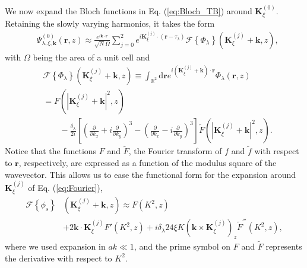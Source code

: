 \documentclass[showpacs,aps,prb,reprint,twocolumn]{revtex4-1}
\begin{document}
We now expand the Bloch functions in Eq. (\ref{eq:Bloch_TB}) around $\boldsymbol{K}_\xi^{(0)}$. Retaining the slowly varying harmonics, it takes the form
\begin{align}\label{eq:Bloch_PW}
&\Psi_{\lambda,\xi,\boldsymbol{k}}^{(0)}(\boldsymbol{r},z)
\approx
\frac{e^{i\boldsymbol{k}\cdot\boldsymbol{r}}}{\sqrt{N}\Omega} \sum^2_{j=0} e^{i\boldsymbol{K}^{(j)}_\xi\cdot(\boldsymbol{r} - \tau_\lambda)} 
\mathcal{F}\left\{\Phi_\lambda\right\} (\boldsymbol{K}^{(j)}_\xi+\boldsymbol{k},z),
\end{align}
with $\Omega$ being the area of a unit cell and
\begin{align}\label{eq:Fourier}
&\mathcal{F}\left\{\Phi_\lambda\right\}
(\boldsymbol{K}^{(j)}_\xi+\boldsymbol{k},z)
\equiv
\int_{\mathbb{R}^2}
\mathrm{d}\boldsymbol{r}
e^{i(\boldsymbol{K}^{(j)}_\xi+\boldsymbol{k})\cdot\boldsymbol{r}}
\Phi_\lambda(\boldsymbol{r},z)\\
&=F(|\boldsymbol{K}^{(j)}_\xi+\boldsymbol{k}|^2,z)\nonumber\\
&\qquad-
\frac{\delta_\lambda}{2i}
\left[
\left(
\frac{\partial}{\partial k_x}+
i
\frac{\partial}{\partial k_y}
\right)^3-
\left(
\frac{\partial}{\partial k_x}-
i
\frac{\partial}{\partial k_y}
\right)^3
\right]
\tilde{F}(|\boldsymbol{K}^{(j)}_\xi+\boldsymbol{k}|^2,z).
\nonumber
\end{align}
Notice that the functions $F$ and $\tilde{F}$, the Fourier transform of $f$ and $\tilde{f}$ with respect to $\boldsymbol{r}$, respectively, are expressed as a function of the modulus square of the wavevector. This allows us to ease the functional form for the expansion around $\boldsymbol{K}_\xi^{(j)}$ of Eq. (\ref{eq:Fourier}), 
\begin{align}
\mathcal{F}\left\{\phi_s\right\}&
(\boldsymbol{K}_\xi^{(j)}+\boldsymbol{k},z)\approx
F(K^2,z)\\
&+2\boldsymbol{k}\cdot\boldsymbol{K}_\xi^{(j)}F'(K^2,z)
+i\delta_\lambda 24\xi K
\left(
\boldsymbol{k}\times\boldsymbol{K}_\xi^{(j)}
\right)_z
\tilde{F}^{'''}(K^2,z),\nonumber
\end{align}
where we used expansion in $ak\ll1$, and the prime symbol on $F$ and $\tilde{F}$ represents the derivative with respect to $K^2$. 
\end{document}
